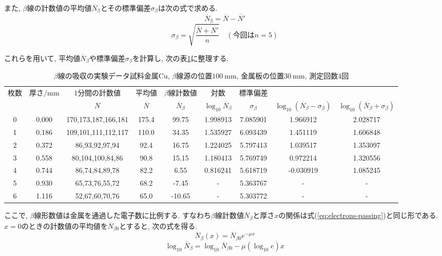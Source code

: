 \documentclass{jarticle}
\begin{document}
また, $\beta$線の計数値の平均値$\overline{N}_\mathrm{\beta}$とその標準偏差$\sigma_\beta$は次の式で求める.
\begin{equation}
  \overline{N}_\mathrm{\beta} = \overline{N} - \overline{N'}
\end{equation}
\begin{equation}
  \sigma_\beta = \sqrt{\frac{\overline{N} + \overline{N'}}{n}} \quad (今回はn = 5)
\end{equation}

これらを用いて, 平均値$\overline{N}_\beta$や標準偏差$\sigma_\beta$を計算し, 次の表\ref{tb:Cu-foil-count-distribution}に整理する.

\begin{table}[H]
  \caption{$\beta$線の吸収の実験データ\protect\linebreak 試料金属$\mathrm{Cu}$, $\beta$線源の位置$100\ \mathrm{mm}$, 金属板の位置$30\ \mathrm{mm}$, 測定回数$4$回}
  \label{tb:Cu-foil-count-distribution}
  \small
  \hspace{-3.3cm}
  \begin{tabular}{ccccccccc}
    \hline
    枚数 & 厚さ$/\mathrm{mm}$ & $1$分間の計数値 & 平均値 & $\beta$線計数値 & 対数 & 標準偏差 & & \\
    & & $N$ & $\overline{N}$ & $\overline{N}_\beta$ & $\log_{10} \overline{N}_\beta$ & $\sigma_\beta$ & $\log_{10} (\overline{N}_\beta - \sigma_\beta)$ & $\log_{10} (\overline{N}_\beta + \sigma_\beta)$ \\
    \hline
    0 & 0.000 & 170,173,187,166,181 & 175.4 & 99.75 & 1.998913 & 7.085901 & 1.966912 & 2.028717 \\
    1 & 0.186 & 109,101,111,112,117 & 110.0 & 34.35 & 1.535927 & 6.093439 & 1.451119 & 1.606848 \\
    2 & 0.372 & 86,93,92,97,94 & 92.4 & 16.75 & 1.224025 & 5.797413 & 1.039517 & 1.353097 \\
    3 & 0.558 & 80,104,100,84,86 & 90.8 & 15.15 & 1.180413 & 5.769749 & 0.972214 & 1.320556 \\
    4 & 0.744 & 86,74,84,89,78 & 82.2 & 6.55 & 0.816241 & 5.618719 & -0.030919 & 1.085245 \\
    5 & 0.930 & 65,73,76,55,72 & 68.2 & -7.45 & - & 5.363767 & - & - \\
    6 & 1.116 & 52,67,60,70,76 & 65.0 & -10.65 & - & 5.303772 & - & - \\
    \hline
  \end{tabular}
\end{table}

ここで, $\beta$線形数値は金属を通過した電子数に比例する.
すなわち$\beta$線計数値$\overline{N}_\beta$と厚さ$x$の関係は式(\ref{eq:electrons-passing})と同じ形である.
$x=0$のときの計数値の平均値を$\overline{N}_{\beta 0}$とすると, 次の式を得る.
\begin{equation}
  \overline{N}_\beta (x) = \overline{N}_{\beta 0} e^{-\mu x}
\end{equation}
\begin{equation}
  \log_{10}\overline{N}_\beta = \log_{10}\overline{N}_{\beta 0} - \mu(\log_{10}e)x
\end{equation}
\end{document}
